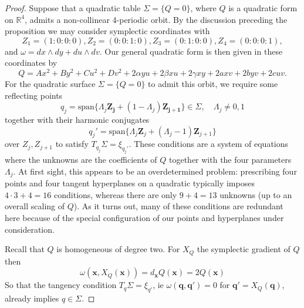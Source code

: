 \documentclass{article}
\newcommand{\R}{\mathbb{R}} %
\begin{document}
\begin{proof}
Suppose that a quadratic table $\Sigma = \{ Q = 0\}$, where $Q$ is a quadratic form on 
$\R^4$, admits a non-collinear 4-periodic orbit. By the discussion preceding the 
proposition we may consider symplectic coordinates with  %
\[Z_1 = (1:0:0:0), Z_2 = (0:0:1:0), Z_3 = (0:1:0:0), Z_4 = (0:0:0:1),\]
and $\omega = dx\wedge dy + du\wedge dv$. %
Our general quadratic form is then given in these coordinates by
\[Q = Ax^2 + By^2 + Cu^2 + Dv^2 + 2\alpha yu + 2\beta xu + 2\gamma xy + 2axv + 2byv + 2cuv.\]
For the quadratic surface $\Sigma = \{Q = 0\}$ to admit this orbit, we require some 
reflecting points
    $$q_j = \text{span}\{ \Lambda_j \boldsymbol{Z_j} + (1-\Lambda_j)\boldsymbol{Z_{j+1}}\}\in \Sigma, \quad \Lambda_j\ne 0,1$$
together with their harmonic conjugates
$$q_j' = \text{span}\{ \Lambda_j \boldsymbol{Z}_j + (\Lambda_j - 1)\boldsymbol{Z}_{j+1}\}$$
over $Z_j, Z_{j+1}$ to satisfy $T_{q_j}\Sigma = \xi_{q_j'}$. These conditions are a system 
of equations where the unknowns are the coefficients of $Q$ together with the four 
parameters $\Lambda_j$. At first sight, this appears to be an overdetermined problem: 
prescribing four points and four tangent hyperplanes on a quadratic typically imposes 
$4\cdot 3+ 4=16$ conditions, whereas there are only $9+4=13$ unknowns (up to an overall 
scaling of $Q$). As it turns out, many of these conditions are redundant here because of 
the special configuration of our points and hyperplanes under consideration. 

Recall that $Q$ is homogeneous of degree two. For $X_Q$ the symplectic gradient of $Q$ 
then%
\[    \omega(\boldsymbol{x},X_Q(\boldsymbol{x})) = d_{\boldsymbol{x}}Q({\boldsymbol{x}}) = 2Q({\boldsymbol{x}}) \]
So that the tangency condition $T_q\Sigma = \xi_{q'}$, ie $\omega({\boldsymbol{q}}, 
{\boldsymbol{q}}') = 0$ for ${\boldsymbol{q}}' = X_Q({\boldsymbol{q}})$, already implies 
$q\in \Sigma$.


\end{proof}
\end{document}
